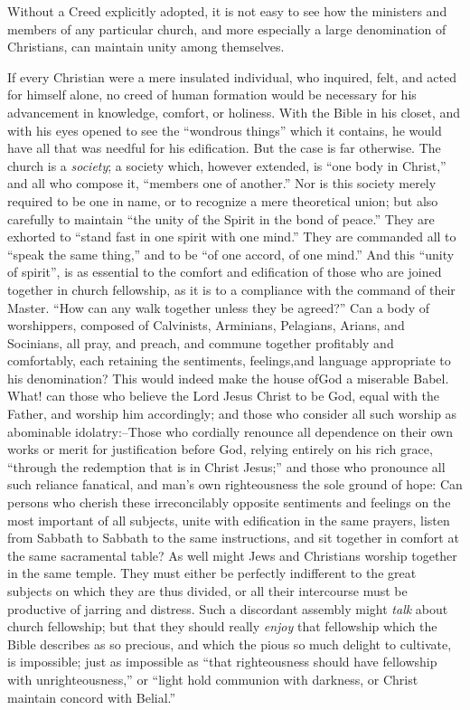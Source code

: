 \documentclass[
]{book}
\begin{document}
Without a Creed explicitly adopted, it is not easy to see how the ministers and members of any particular church, and more especially a large denomination of Christians, can maintain unity among themselves.

If every Christian were a mere insulated individual, who inquired, felt, and acted for himself alone, no creed of human formation would be necessary for his advancement in knowledge, comfort, or holiness. With the Bible in his closet, and with his eyes opened to see the ``wondrous things'' which it contains, he would have all that was needful for his edification. But the case is far otherwise. The church is a \emph{society}; a society which, however extended, is ``one body in Christ,'' and all who compose it, ``members one of another.'' Nor is this society merely required to be one in name, or to recognize a mere theoretical union; but also carefully to maintain ``the unity of the Spirit in the bond of peace.'' They are exhorted to ``stand fast in one spirit with one mind.'' They are commanded all to ``speak the same thing,'' and to be ``of one accord, of one mind.'' And this ``unity of spirit'', is as essential to the comfort and edification of those who are joined together in church fellowship, as it is to a compliance with the command of their Master. ``How can any walk together unless they be agreed?'' Can a body of worshippers, composed of Calvinists, Arminians, Pelagians, Arians, and Socinians, all pray, and preach, and commune together profitably and comfortably, each retaining the sentiments, feelings,and language appropriate to his denomination? This would indeed make the house ofGod a miserable Babel. What! can those who believe the Lord Jesus Christ to be God, equal with the Father, and worship him accordingly; and those who consider all such worship as abominable idolatry:--Those who cordially renounce all dependence on their own works or merit for justification before God, relying entirely on his rich grace, ``through the redemption that is in Christ Jesus;'' and those who pronounce all such reliance fanatical, and man's own righteousness the sole ground of hope: Can persons who cherish these irreconcilably opposite sentiments and feelings on the most important of all subjects, unite with edification in the same prayers, listen from Sabbath to Sabbath to the same instructions, and sit together in comfort at the same sacramental table? As well might Jews and Christians worship together in the same temple. They must either be perfectly indifferent to the great subjects on which they are thus divided, or all their intercourse must be productive of jarring and distress. Such a discordant assembly might \emph{talk} about church fellowship; but that they should really \emph{enjoy} that fellowship which the Bible describes as so precious, and which the pious so much delight to cultivate, is impossible; just as impossible as ``that righteousness should have fellowship with unrighteousness,'' or ``light hold communion with darkness, or Christ maintain concord with Belial.''
\end{document}
